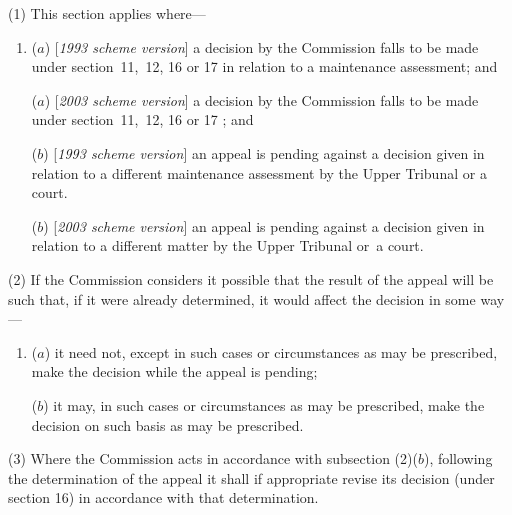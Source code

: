 \documentclass[12pt,a4paper]{article}
\begin{document}
(1) This section applies where—
\begin{enumerate}\item[]
($a$) [\emph{1993 scheme version}] a decision by the 
Commission  %
falls to be made under section~11,~12, 16 or 17 in relation to a maintenance assessment; and

($a$) [\emph{2003 scheme version}] a decision by the 
Commission  %
falls to be made under section~11,~12, 16 or 17%
; and

($b$) [\emph{1993 scheme version}] an appeal is pending against a decision given in relation to a different maintenance assessment by 
the Upper Tribunal  %
or a court.

($b$) [\emph{2003 scheme version}] an appeal is pending against a decision given in relation to a different matter by 
the Upper Tribunal  %
or~a court.
\end{enumerate}

(2) If the 
Commission  %
considers it possible that the result of the appeal will be such that, if it were already determined, it would affect the decision in some way—
\begin{enumerate}\item[]
($a$) 
it  %
need not, except in such cases or circumstances as may be prescribed, make the decision while the appeal is pending;

($b$) 
it  %
may, in such cases or circumstances as may be prescribed, make the decision on such basis as may be prescribed.
\end{enumerate}

(3) Where the 
Commission  %
acts in accordance with subsection (2)($b$), following the determination of the appeal 
it  %
shall if appropriate revise 
its  %
decision (under section 16) in accordance with that determination.
\end{document}
